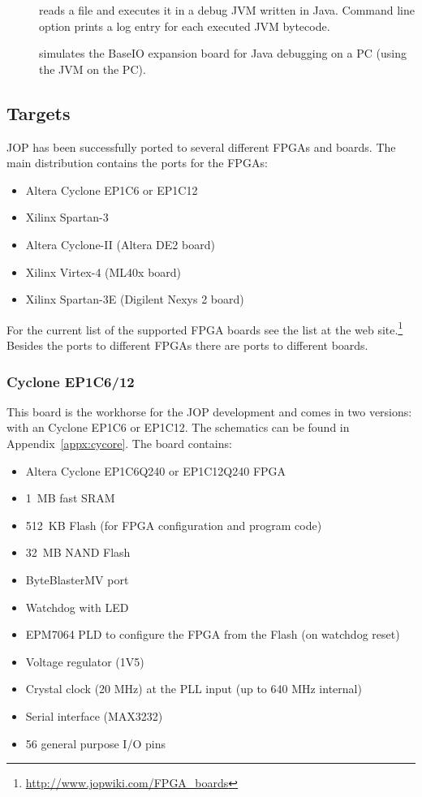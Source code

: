 \begin{description}
    \item[] reads a  file and executes it
        in a debug JVM written in Java. Command line option
         prints a log entry for each executed
        JVM bytecode.
    \item[] simulates the BaseIO expansion board for
        Java debugging on a PC (using the JVM on the PC).
\end{description}

\subsection{Targets}

JOP has been successfully ported to several different FPGAs and
boards. The main distribution contains the ports for the FPGAs:

\begin{itemize}
    \item Altera Cyclone EP1C6 or EP1C12
    \item Xilinx Spartan-3
    \item Altera Cyclone-II (Altera DE2 board)
    \item Xilinx Virtex-4 (ML40x board)
    \item Xilinx Spartan-3E (Digilent Nexys 2 board)
\end{itemize}

For the current list of the supported FPGA boards see the list at the
web site.\footnote{\url{http://www.jopwiki.com/FPGA_boards}} Besides
the ports to different FPGAs there are ports to different boards.

\subsubsection{Cyclone EP1C6/12}

This board is the workhorse for the JOP development and comes in two
versions: with an Cyclone EP1C6 or EP1C12. The schematics can be
found in Appendix~\ref{appx:cycore}. The board contains:

\begin{itemize}
    \item Altera Cyclone EP1C6Q240 or EP1C12Q240 FPGA
    \item 1~MB fast SRAM
    \item 512~KB Flash (for FPGA configuration and program code)
    \item 32~MB NAND Flash
    \item ByteBlasterMV port
    \item Watchdog with LED
    \item EPM7064 PLD to configure the FPGA from the Flash (on watchdog reset)
    \item Voltage regulator (1V5)
    \item Crystal clock (20 MHz) at the PLL input (up to 640 MHz internal)
    \item Serial interface (MAX3232)
    \item 56 general purpose I/O pins
\end{itemize}

